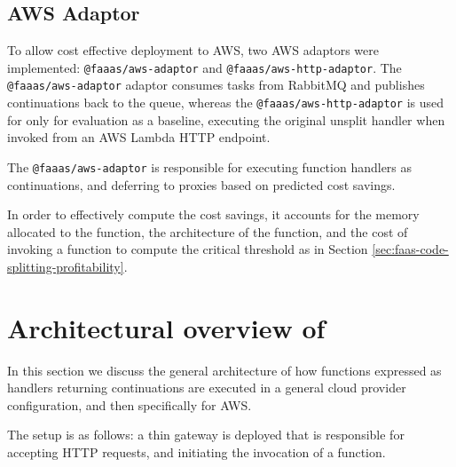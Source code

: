\subsection{AWS Adaptor}
To allow cost effective deployment to AWS, two \faaasc{} AWS adaptors were implemented: \verb|@faaas/aws-adaptor| and \verb|@faaas/aws-http-adaptor|. The \verb|@faaas/aws-adaptor| adaptor consumes tasks from RabbitMQ and publishes continuations back to the queue, whereas the \verb|@faaas/aws-http-adaptor| is used for only for evaluation as a baseline, executing the original unsplit handler when invoked from an AWS Lambda HTTP endpoint.

The \verb|@faaas/aws-adaptor| is responsible for executing function handlers as continuations, and deferring to proxies based on predicted cost savings.

In order to effectively compute the cost savings, it accounts for the memory allocated to the function, the architecture of the function, and the cost of invoking a function to compute the critical threshold as in Section \ref{sec:faas-code-splitting-profitability}.

\section{Architectural overview of \faaas{}}
In this section we discuss the general architecture of how functions expressed as handlers returning continuations are executed in a general cloud provider configuration, and then specifically for AWS.

The setup is as follows: a thin gateway is deployed that is responsible for accepting HTTP requests, and initiating the invocation of a function.

